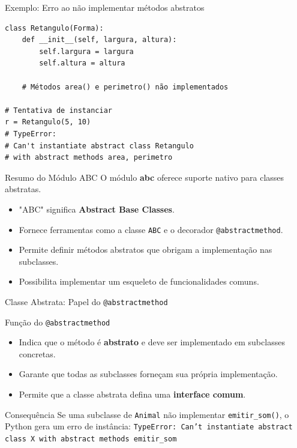 \begin{frame}[fragile]{Exemplo: Erro ao não implementar métodos abstratos}
    \small
    \begin{verbatim}
class Retangulo(Forma):
    def __init__(self, largura, altura):
        self.largura = largura
        self.altura = altura

    # Métodos area() e perimetro() não implementados

# Tentativa de instanciar
r = Retangulo(5, 10)
# TypeError:
# Can't instantiate abstract class Retangulo
# with abstract methods area, perimetro
\end{verbatim}
\end{frame}


\begin{frame}{Resumo do Módulo ABC}
    O módulo \textbf{abc} oferece suporte nativo para classes abstratas.
    \begin{itemize}
        \item "ABC" significa \textbf{Abstract Base Classes}.
        \item Fornece ferramentas como a classe \texttt{ABC} e o decorador \texttt{@abstractmethod}.
        \item Permite definir métodos abstratos que obrigam a implementação nas subclasses.
        \item Possibilita implementar um esqueleto de funcionalidades comuns.

    \end{itemize}
\end{frame}



\begin{frame}[fragile]{Classe Abstrata: Papel do \texttt{@abstractmethod}}

    \begin{block}{Função do \texttt{@abstractmethod}}
        \begin{itemize}
            \item Indica que o método é \textbf{abstrato} e deve ser implementado em subclasses concretas.
            \item Garante que todas as subclasses forneçam sua própria implementação.
            \item Permite que a classe abstrata defina uma \textbf{interface comum}.
        \end{itemize}
    \end{block}

    \begin{block}{Consequência}
        Se uma subclasse de \texttt{Animal} não implementar \texttt{emitir\_som()}, o Python gera um erro de instância:
        \texttt{TypeError: Can't instantiate abstract class X with abstract methods emitir\_som}
    \end{block}




\end{frame}

